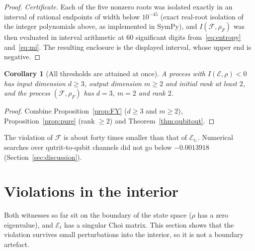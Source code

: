 \documentclass[11pt,a4paper]{article}
\newtheorem{corollary}[theorem]{Corollary}
\theoremstyle{definition}\newtheorem{definition}[theorem]{Definition}
\theoremstyle{remark}\newtheorem{remark}[theorem]{Remark}
\newcommand{\E}{\mathcal E}
\newcommand{\F}{\mathcal F}
\begin{document}
\begin{proof}
\emph{Certificate.} Each of the five nonzero roots was isolated exactly in an interval of rational endpoints of width below $10^{-45}$ (exact real-root isolation of the integer polynomials above, as implemented in SymPy), and $I(\F,\rho_F)$ was then evaluated in interval arithmetic at 60 significant digits from~\eqref{eq:entropy} and~\eqref{eq:mi}. The resulting enclosure is the displayed interval, whose upper end is negative.
\end{proof}

\begin{corollary}[All thresholds are attained at once]\label{cor:joint}
A process with $I(\E,\rho)<0$ has input dimension $d\ge3$, output dimension $m\ge2$ and initial rank at least $2$, and the process $(\F,\rho_F)$ has $d=3$, $m=2$ and rank $2$.
\end{corollary}
\begin{proof}
Combine Proposition~\ref{prop:FY} ($d\ge3$ and $m\ge2$), Proposition~\ref{prop:pure} (rank $\ge2$) and Theorem~\ref{thm:qubitout}.
\end{proof}
The violation of $\F$ is about forty times smaller than that of $\E_{t_*}$. Numerical searches over qutrit-to-qubit channels did not go below $-0.0013918$ (Section~\ref{sec:discussion}).

\section{Violations in the interior}\label{sec:interior}
Both witnesses so far sit on the boundary of the state space ($\rho$ has a zero eigenvalue), and $\E_t$ has a singular Choi matrix. This section shows that the violation survives small perturbations into the interior, so it is not a boundary artefact.
\end{document}
